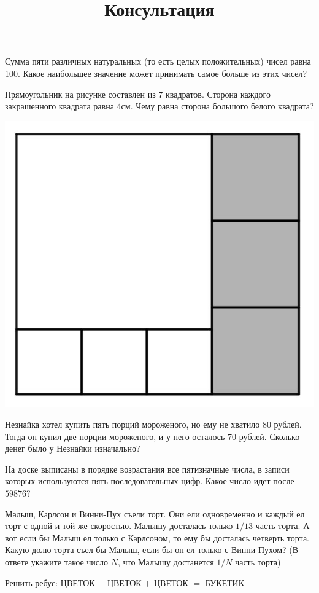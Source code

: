 \begin{listofex}
	\item Сумма пяти различных натуральных (то есть целых положительных) чисел равна 100. Какое
	наибольшее значение может принимать самое больше из этих чисел?
	\item Прямоугольник на рисунке составлен из 7 квадратов. Сторона каждого закрашенного квадрата
	равна 4см. Чему равна сторона большого белого квадрата?
	\begin{center}
		\includegraphics[width=0.3\linewidth]{124.jpg}
	\end{center}
	\item Незнайка хотел купить пять порций мороженого, но ему не хватило 80 рублей. Тогда он купил две порции мороженого, и у него осталось 70 рублей. Сколько денег было у Незнайки изначально?
	\item На доске выписаны в порядке возрастания все пятизначные числа, в записи которых используются
	пять последовательных цифр. Какое число идет после \( 59876 \)?
	\item Малыш, Карлсон и Винни-Пух съели торт. Они ели одновременно и каждый ел торт с одной и
	той же скоростью. Малышу досталась только \( 1/13 \) часть торта. А вот если бы Малыш ел только с Карлсоном, то ему бы досталась четверть торта. Какую долю торта съел бы Малыш, если бы он ел только с Винни-Пухом? (В ответе укажите такое число \( N \), что Малышу достанется \( 1/N \) часть торта)

	\item Решить ребус: ЦВЕТОК \( + \) ЦВЕТОК \( + \) ЦВЕТОК \( = \) БУКЕТИК
\end{listofex}
\newpage
\title{Консультация}
